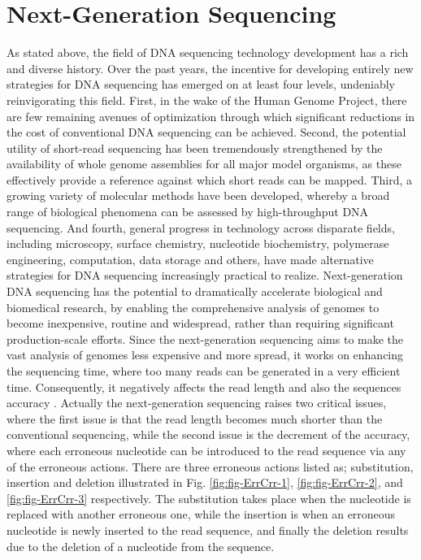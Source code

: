 \documentclass[12pt,openany]{llncs}
\begin{document}
\section{Next-Generation Sequencing}
As stated above, the field of DNA sequencing technology development has a rich and diverse history. Over the past years, the incentive for developing entirely new strategies for DNA sequencing has emerged on at least four levels, undeniably reinvigorating this field\cite{NGS,NGS1}. First, in the wake of the Human Genome Project, there are few remaining avenues of optimization through which significant reductions in the cost of conventional DNA sequencing can be achieved. Second, the potential utility of short-read sequencing has been tremendously strengthened by the availability of whole genome assemblies for all major model organisms, as these effectively provide a reference against which short reads can be mapped. Third, a growing variety of molecular methods have been developed, whereby a broad range of biological phenomena can be assessed by high-throughput DNA sequencing. And fourth, general progress in technology across disparate fields, including microscopy, surface chemistry, nucleotide biochemistry, polymerase engineering, computation, data storage and others, have made alternative strategies for DNA sequencing increasingly practical to realize. Next-generation DNA sequencing has the potential to dramatically accelerate biological and biomedical research, by enabling the comprehensive analysis of genomes to become inexpensive, routine and widespread, rather than requiring significant production-scale efforts. Since the next-generation sequencing aims to make the vast analysis of genomes less expensive and more spread, it works on enhancing the sequencing time, where too many reads can be generated in a very efficient time. Consequently, it negatively affects the read length and also the sequences accuracy \cite{NGS2}. Actually the next-generation sequencing raises two critical issues, where the first issue is that the read length becomes much shorter than the conventional sequencing, while the second issue is the decrement of the accuracy, where each erroneous nucleotide can be introduced to the read sequence via any of the erroneous actions. There are three erroneous actions listed as; substitution, insertion and deletion illustrated in Fig. \ref{fig:fig-ErrCrr-1}, \ref{fig:fig-ErrCrr-2}, and \ref{fig:fig-ErrCrr-3} respectively. The substitution takes place when the nucleotide is replaced with another erroneous one, while the insertion is when an erroneous nucleotide is newly inserted to the read sequence, and finally the deletion results due to the deletion of a nucleotide from the sequence.
\end{document}
